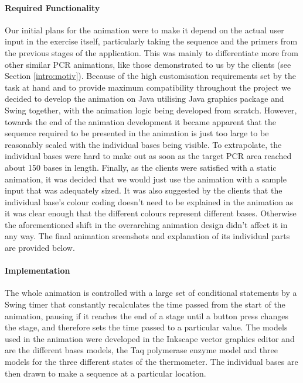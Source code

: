 \paragraph{Required Functionality}
Our initial plans for the animation were to make it depend on the actual user input in the exercise itself, particularly taking the sequence and the primers from the previous stages of the application. This was mainly to differentiate more from other similar PCR animations, like those demonstrated to us by the clients (see Section \ref{intro:motiv}). Because of the high customisation requirements set by the task at hand and to provide maximum compatibility throughout the project we decided to develop the animation on Java utilising Java graphics package and Swing together, with the animation logic being developed from scratch. However, towards the end of the animation development it became apparent that the sequence required to be presented in the animation is just too large to be reasonably scaled with the individual bases being visible. To extrapolate, the individual bases were hard to make out as soon as the target PCR area reached about 150 bases in length. Finally, as the clients were satisfied with a static animation, it was decided that we would just use the animation with a sample input that  was adequately sized. It was also suggested by the clients that the individual base's colour coding doesn't need to be explained in the animation as it was clear enough that the different colours represent different bases. Otherwise the aforementioned shift in the overarching animation design didn't affect it in any way. The final animation sreenshots and explanation of its individual parts are provided below.

\paragraph{Implementation}
The whole animation is controlled with a large set of conditional statements by a Swing timer that constantly recalculates the time passed from the start of the animation, pausing if it reaches the end of a stage until a button press changes the stage, and therefore sets the time passed to a particular value. The models used in the animation were developed in the Inkscape vector graphics editor and are the different bases models, the Taq polymerase enzyme model and three models for the three different states of the thermometer. The individual bases are then drawn to make a sequence at a particular location.


